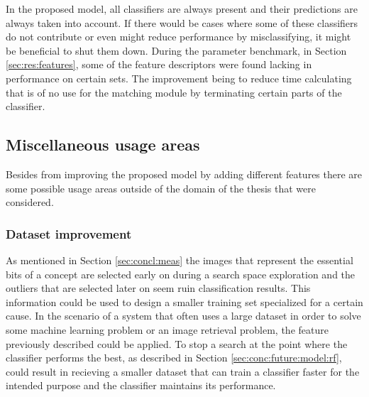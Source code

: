 In the proposed model, all classifiers are always present and their predictions are always taken into account. If there would be cases where some of these classifiers do not contribute or even might reduce performance by misclassifying, it might be beneficial to shut them down. During the parameter benchmark, in Section \ref{sec:res:features}, some of the feature descriptors were found lacking in performance on certain sets. The improvement being to reduce time calculating that is of no use for the matching module by terminating certain parts of the classifier.

\subsection{Miscellaneous usage areas}
\label{sec:conc:future:misc}
Besides from improving the proposed model by adding different features there are some possible usage areas outside of the domain of the thesis that were considered. 
\subsubsection{Dataset improvement}
\label{sec:conc:future:misc:data}

As mentioned in Section \ref{sec:concl:meas} the images that represent the essential bits of a concept are selected early on during a search space exploration and the outliers that are selected later on seem ruin classification results. This information could be used to design a smaller training set specialized for a certain cause. 
In the scenario of a system that often uses a large dataset in order to solve some machine learning problem or an image retrieval problem, the feature previously described could be applied.
To stop a search at the point where the classifier performs the best, as described in Section \ref{sec:conc:future:model:rf}, could result in recieving a smaller dataset that can train a classifier faster for the intended purpose and the classifier maintains its performance. 
